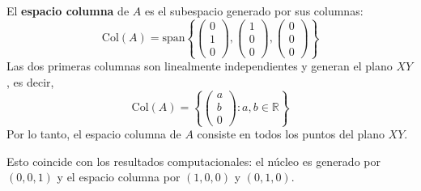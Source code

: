 \begin{prob}
\begin{myproof}
El \textbf{espacio columna} de $A$ es el subespacio generado por sus columnas:
\[
\text{Col}(A) = \text{span}\left\{ \begin{pmatrix} 0 \\ 1 \\ 0 \end{pmatrix}, \begin{pmatrix} 1 \\ 0 \\ 0 \end{pmatrix}, \begin{pmatrix} 0 \\ 0 \\ 0 \end{pmatrix} \right\}
\]
Las dos primeras columnas son linealmente independientes y generan el plano $XY$, es decir,
\[
\text{Col}(A) = \left\{ \begin{pmatrix} a \\ b \\ 0 \end{pmatrix} : a, b \in \mathbb{R} \right\}
\]
Por lo tanto, el espacio columna de $A$ consiste en todos los puntos del plano $XY$.

Esto coincide con los resultados computacionales: el núcleo es generado por $(0,0,1)$ y el espacio columna por $(1,0,0)$ y $(0,1,0)$.
\end{myproof}
\end{prob}


